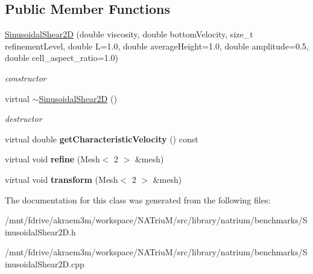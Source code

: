 \subsection*{Public Member Functions}
\begin{DoxyCompactItemize}
\item 
\hypertarget{classnatrium_1_1SinusoidalShear2D_a795ec020c20dac79280c1eec89bb8b11}{
\hyperlink{classnatrium_1_1SinusoidalShear2D_a795ec020c20dac79280c1eec89bb8b11}{SinusoidalShear2D} (double viscosity, double bottomVelocity, size\_\-t refinementLevel, double L=1.0, double averageHeight=1.0, double amplitude=0.5, double cell\_\-aspect\_\-ratio=1.0)}
\label{classnatrium_1_1SinusoidalShear2D_a795ec020c20dac79280c1eec89bb8b11}

\begin{DoxyCompactList}\small\item\em constructor \item\end{DoxyCompactList}\item 
\hypertarget{classnatrium_1_1SinusoidalShear2D_a7aaf185e32e29f1f50b3f9db9c213a2c}{
virtual \hyperlink{classnatrium_1_1SinusoidalShear2D_a7aaf185e32e29f1f50b3f9db9c213a2c}{$\sim$SinusoidalShear2D} ()}
\label{classnatrium_1_1SinusoidalShear2D_a7aaf185e32e29f1f50b3f9db9c213a2c}

\begin{DoxyCompactList}\small\item\em destructor \item\end{DoxyCompactList}\item 
\hypertarget{classnatrium_1_1SinusoidalShear2D_af1162ca66457ddfa460f379f1544a5f5}{
virtual double {\bfseries getCharacteristicVelocity} () const }
\label{classnatrium_1_1SinusoidalShear2D_af1162ca66457ddfa460f379f1544a5f5}

\item 
\hypertarget{classnatrium_1_1SinusoidalShear2D_a71fb2e08f98dceb652a10d4a8da8de0e}{
virtual void {\bfseries refine} (Mesh$<$ 2 $>$ \&mesh)}
\label{classnatrium_1_1SinusoidalShear2D_a71fb2e08f98dceb652a10d4a8da8de0e}

\item 
\hypertarget{classnatrium_1_1SinusoidalShear2D_a759174d865cdff661b709554c625e8cf}{
virtual void {\bfseries transform} (Mesh$<$ 2 $>$ \&mesh)}
\label{classnatrium_1_1SinusoidalShear2D_a759174d865cdff661b709554c625e8cf}

\end{DoxyCompactItemize}


The documentation for this class was generated from the following files:\begin{DoxyCompactItemize}
\item 
/mnt/fdrive/akraem3m/workspace/NATriuM/src/library/natrium/benchmarks/SinusoidalShear2D.h\item 
/mnt/fdrive/akraem3m/workspace/NATriuM/src/library/natrium/benchmarks/SinusoidalShear2D.cpp\end{DoxyCompactItemize}
